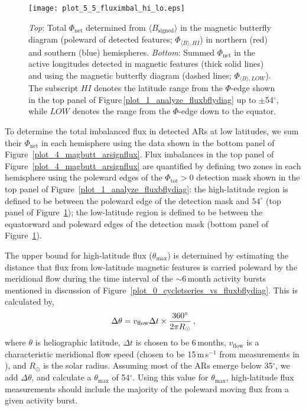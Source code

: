 \begin{figure}[!t]
\centerline{\texttt{[image: plot\_5\_5\_fluximbal\_hi\_lo.eps]}}
\caption[The $\Phi_{\mathrm{net}}$ measured in each hemisphere.]{\emph{Top}: Total $\Phi_{\mathrm{net}}$ determined from $\langle B_{\mathrm{signed}}\rangle$ in the magnetic butterfly diagram (poleward of detected features; $\Phi_{\langle B \rangle,HI}$) in northern (red) and southern (blue) hemispheres. \emph{Bottom}: Summed $\Phi_{\mathrm{net}}$ in the active longitudes detected in magnetic features (thick solid lines) and using the magnetic butterfly diagram (dashed lines; $\Phi_{\langle B \rangle,LOW}$). The subscript $HI$ denotes the latitude range from the $\Phi$-edge shown in the top panel of Figure\,\ref{plot_1_analyze_fluxbflydiag} up to $\pm$54$^\circ$, while $LOW$ denotes the range from the $\Phi$-edge down to the equator.}
\label{plot_5_fluximbal_hi_lo}
\end{figure}

To determine the total imbalanced flux in detected \glspl{AR} at low latitudes, we sum their $\Phi_{\mathrm{net}}$ in each hemisphere using the data shown in the bottom panel of Figure~\ref{plot_4_magbutt_arsignflux}. 
Flux imbalances in the top panel of Figure~\ref{plot_4_magbutt_arsignflux} are quantified by defining two zones in each hemisphere using the poleward edges of the $\Phi_{\mathrm{tot}}$$>$$0$ detection mask shown in the top panel of Figure~\ref{plot_1_analyze_fluxbflydiag}: the high-latitude region is defined to be between the poleward edge of the detection mask and $54^{\circ}$ (top panel of Figure~\ref{plot_5_fluximbal_hi_lo}); the low-latitude region is defined to be between the equatorward and poleward edges of the detection mask (bottom panel of Figure~\ref{plot_5_fluximbal_hi_lo}). 

The upper bound for high-latitude flux ($\theta_{\mathrm{max}}$) is determined by estimating the distance that flux from low-latitude magnetic features is carried poleward by the meridional flow during the time interval of the $\sim$6\,month activity bursts mentioned in discussion of Figure~\ref{plot_0_cycletseries_vs_fluxbflydiag}. This is calculated by,
\begin{equation}
\Delta \theta = v_{\mathrm{flow}}\Delta t \times \frac{360^{\circ}}{2\pi R_{\odot}} \mbox{\,,}
\end{equation}
where $\theta$ is heliographic latitude, $\Delta t$ is chosen to be 6\,months, $v_{\mathrm{flow}}$ is a characteristic meridional flow speed (chosen to be 15\,m\,s$^{-1}$ from measurements in \citet{Hathaway:2010}), and $R_{\odot}$ is the solar radius. Assuming most of the \glspl{AR} emerge below 35$^{\circ}$, we add $\Delta \theta$, and calculate a $\theta_{\mathrm{max}}$ of 54$^\circ$. 
Using this value for $\theta_{\mathrm{max}}$, high-latitude flux measurements should include the majority of the poleward moving flux from a given activity burst.


